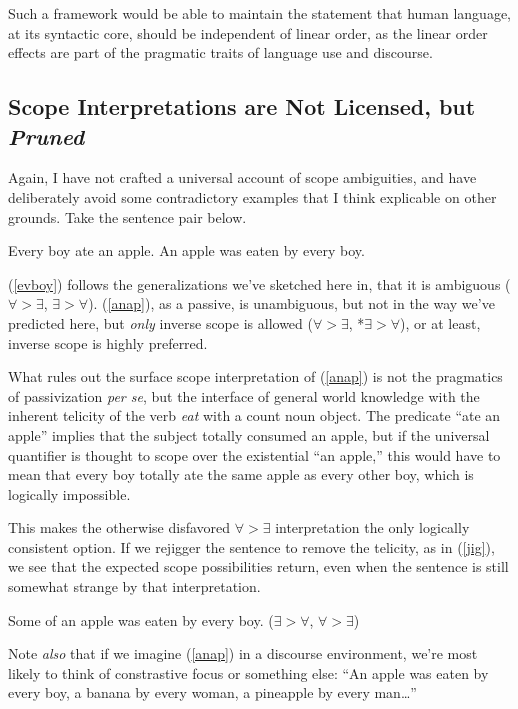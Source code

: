 \documentclass{article}
\begin{document}
Such a framework would be able to maintain the statement that human language, at its syntactic core, should be independent of linear order, as the linear order effects are part of the pragmatic traits of language use and discourse.

\subsection{Scope Interpretations are Not Licensed, but \emph{Pruned}}

Again, I have not crafted a universal account of scope ambiguities, and have deliberately avoid some contradictory examples that I think explicable on other grounds. Take the sentence pair below.

\begin{exe}
\ex Every boy ate an apple.\label{evboy}
\ex An apple was eaten by every boy.\label{anap}
\end{exe}

(\ref{evboy}) follows the generalizations we've sketched here in, that it is ambiguous ($\forall>\exists$, $\exists>\forall$). (\ref{anap}), as a passive, is unambiguous, but not in the way we've predicted here, but \emph{only} inverse scope is allowed ($\forall>\exists$, *$\exists>\forall$), or at least, inverse scope is highly preferred.


What rules out the surface scope interpretation of (\ref{anap}) is not the pragmatics of passivization \emph{per se}, but the interface of general world knowledge with the inherent telicity of the verb \emph{eat} with a count noun object. The predicate ``ate an apple'' implies that the subject totally consumed an apple, but if the universal quantifier is thought to scope over the existential ``an apple,'' this would have to mean that every boy totally ate the same apple as every other boy, which is logically impossible.

This makes the otherwise disfavored $\forall>\exists$ interpretation the only logically consistent option. If we rejigger the sentence to remove the telicity, as in (\ref{jig}), we see that the expected scope possibilities return, even when the sentence is still somewhat strange by that interpretation.

\begin{exe}
\ex Some of an apple was eaten by every boy. \hfill ($\exists>\forall$, $\forall>\exists$)\label{jig}
\end{exe}

Note \emph{also} that if we imagine (\ref{anap}) in a discourse environment, we're most likely to think of constrastive focus or something else: ``An apple was eaten by every boy, a banana by every woman, a pineapple by every man\ldots'' 
\end{document}
